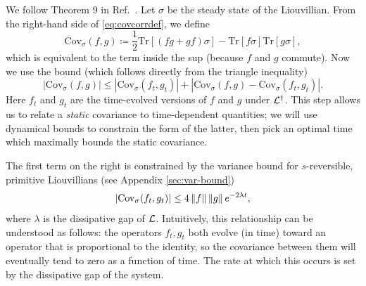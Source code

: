 We follow Theorem 9 in Ref.~\cite{Kastoryano2013}.
Let $\sigma$ be the steady state of the Liouvillian.
From the right-hand side of \cref{eq:covcorrdef}, we define
\begin{equation}
\text{Cov}_\sigma(  f, g) \coloneqq \frac{1}{2} \text{Tr}[(f g + g f) \sigma] -\text{Tr}[f \sigma] \text{Tr}[g \sigma],
\end{equation}
which is equivalent to the term inside the sup (because $f$ and $g$ commute).
Now we use the bound (which follows directly from the triangle inequality)
\begin{equation}
\label{eq:covcorr}
  |\text{Cov}_\sigma(f, g)| \leq |\text{Cov}_\sigma (f_t, g_t)| + |\text{Cov}_\sigma(f, g)  - \text{Cov}_\sigma(f_t, g_t)|.
\end{equation}
Here $f_t$ and $g_t$ are the time-evolved versions of $f$ and $g$ under $\mathcal{L}^\dag$.
This step allows us to relate a \textit{static} covariance to  time-dependent quantities;  we will use dynamical bounds to  constrain the form of the latter, then pick an optimal time which maximally bounds the static covariance.

The first term on the right is constrained by the variance bound for $s$-reversible, primitive Liouvillians (see Appendix \ref{sec:var-bound})
\begin{equation} \label{eq:cov-bound}
|\text{Cov}_\sigma (f_t, g_t)| \leq 4 \left\|f\right\| \left\|g\right\|  e^{-2 \lambda t},
\end{equation}
where $\lambda$ is the dissipative gap of $\mathcal{L}$.
Intuitively, this relationship can be understood as follows: the operators $f_t, g_t$  both evolve (in time) toward an operator  that is proportional to the identity, so the covariance between them will eventually tend to zero as a function of time. The rate at which this occurs is set by the dissipative gap of the system.

